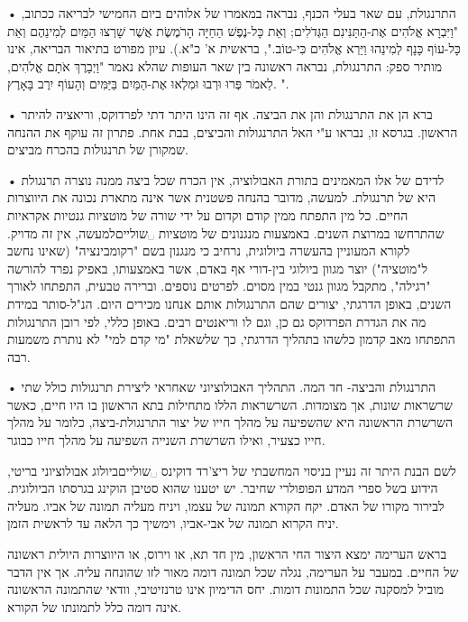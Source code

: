 \begin{enumerate}
•  התרנגולת, עם שאר בעלי הכנף, נבראה במאמרו של אלוהים ביום
  החמישי לבריאה ככתוב, "וַיִּבְרָא אֱלֹהִים אֶת-הַתַּנִּינִם הַגְּדֹלִים; וְאֵת כָּל-נֶפֶשׁ הַחַיָּה הָרֹמֶשֶׂת אֲשֶׁר
  שָׁרְצוּ הַמַּיִם לְמִינֵהֶם וְאֵת כָּל-עוֹף כָּנָף לְמִינֵהוּ וַיַּרְא אֱלֹהִים כִּי-טוֹב.", בראשית א' כ"א.).
    עיון מפורט בתיאור הבריאה, אינו מותיר ספק: התרנגולת, נבראה ראשונה בין שאר
    העופות שהלא נאמר "וַיְבָרֶךְ אֹתָם אֱלֹהִים, לֵאמֹר פְּרוּ וּרְבוּ וּמִלְאוּ אֶת-הַמַּיִם בַּיַּמִּים וְהָעוֹף
    יִרֶב בָּאָרֶץ. ".

•   ברא הן את התרנגולת והן את הביצה. אף
    זה הינו היתר דתי לפרדוקס, וריאציה להיתר הראשון. בגרסא זו, נבראו ע"י האל
    התרנגולות והביצים, בבת אחת. פתרון זה עוקף את ההנחה שמקורן של תרנגולות בהכרח
    מביצים.

•  לדידם של אלו המאמינים בתורת האבולוציה, אין הכרח שכל
    ביצה ממנה נוצרה תרנגולת היא של תרנגולת. למעשה, מדובר בהנחה פשטנית אשר אינה
    מתארת נכונה את היווצרות החיים. כל מין התפתח ממין קודם וקדום על ידי שורה של
    מוטציות גנטיות אקראיות שהתרחשו במרוצת השנים. באמצעות מנגנונים של מוטציות
    ␣שוליים{למעשה, אין זה מדויק. לקורא המעוניין בהעשרה ביולוגית, נרחיב כי
        מנגנון בשם "רקומבינציה" (שאינו נחשב ל"מוטציה") יוצר מגוון ביולוגי
        בין-דורי אף באדם, אשר באמצעותו, באפיק נפרד להורשה "רגילה", מתקבל מגוון
        גנטי במין מסוים. לפרטים נוספים.} וברירה טבעית, התפתחו לאורך השנים,
  באופן הדרגתי, יצורים שהם התרנגולות אותם אנחנו מכירים היום. הנ"ל-סותר במידת מה
  את הגדרת הפרדוקס גם כן, וגם לו וריאנטים רבים. באופן כללי, לפי רובן התרנגולות
  התפתחו מאב קדמון כלשהו בתהליך הדרגתי, כך שלשאלת "מי קדם למי" לא נותרת משמעות
  רבה.

•  התרנגולת והביצה- חד המה. התהליך האבולוציוני שאחראי
ליצירת תרנגולות כולל שתי שרשראות שונות, אך מצומדות. השרשראות הללו מתחילות בתא
הראשון בו היו חיים, כאשר השרשרת הראשונה היא שהשפיעה על מהלך חייו של יצור
התרנגולת-ביצה, כלומר על מהלך חייו כצעיר, ואילו השרשרת השנייה השפיעה על מהלך
חייו כבוגר.

לשם הבנת היתר זה נעיין בניסוי המחשבתי של ריצ'רד דוקינס ␣שוליים{ביולוג
אבולוציוני בריטי, הידוע בשל ספרי המדע הפופולרי שחיבר. יש יטענו שהוא סטיבן
הוקינג בגרסתו הביולוגית.} לבירור מקורו של האדם. יקח הקורא תמונה של עצמו, ויניח
מעליה תמונה של אביו. מעליה יניח הקרוא תמונה של אבי-אביו, וימשיך כך הלאה עד
לראשית הזמן.

בראש הערימה ימצא היצור החי הראשון, מין חד תא, או וירוס, או היווצרות היולית
ראשונה של החיים. במעבר על הערימה, נגלה שכל תמונה דומה מאור לזו שהונחה עליה. אך
אין הדבר מוביל למסקנה שכל התמונות דומות. יחס הדימיון אינו טרנזיטיבי, וודאי
שהתמונה הראשונה אינה דומה כלל לתמונתו של הקורא.


\end{enumerate}

